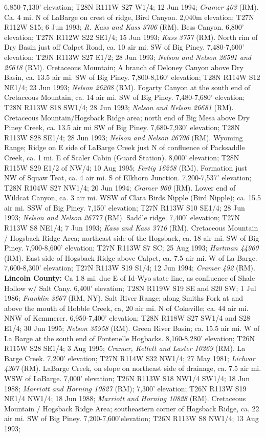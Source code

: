 6,850-7,130’ elevation; T28N R111W S27 W1/4; 12 Jun 1994; \textit{Cramer 403} (RM).  Ca. 4 mi. N of LaBarge on crest of ridge, Bird Canyon. 2,040m elevation; T27N R112W S15; 6 Jun 1993; \textit{R. Kass and Kass 3706} (RM).  Bess Canyon. 6,800’ elevation; T27N R112W S22 SE1/4; 15 Jun 1993; \textit{Kass 3757} (RM).  North rim of Dry Basin just off Calpet Road, ca. 10 air mi. SW of Big Piney. 7,480-7,600’ elevation; T29N R113W S27 E1/2; 28 Jun 1993; \textit{Nelson and Nelson 26591 and 26618} (RM).  Cretaceous Mountain; A branch of Deloney Canyon above Dry Basin, ca. 13.5 air mi. SW of Big Piney. 7,800-8,160’ elevation; T28N R114W S12 NE1/4; 23 Jun 1993; \textit{Nelson 26208} (RM). Fogarty Canyon at the south end of Cretaceous Mountain, ca. 14 air mi. SW of Big Piney. 7,480-7,680’ elevation; T28N R113W S18 SW1/4; 28 Jun 1993; \textit{Nelson and Nelson 26681} (RM).  Cretaceous Mountain/Hogsback Ridge area; north end of Big Mesa above Dry Piney Creek, ca. 13.5 air mi SW of Big Piney.	7,680-7,930' elevation; T28N R113W S28	SE1/4; 28 Jun 1993; \textit{Nelson and Nelson 26706} (RM).  Wyoming Range; Ridge on E side of LaBarge Creek just N of confluence of Packsaddle Creek, ca. 1 mi. E of Scaler Cabin (Guard Station). 8,000’ elevation; T28N R115W S29 E1/2 of NW/4; 10 Aug 1995; \textit{Fertig 16258} (RM).  Formation just NW of Squaw Teat, ca. 4 air mi. S of Elkhorn Junction. 7,200-7,537' elevation; T28N R104W S27 NW1/4; 20 Jun 1994; \textit{Cramer 960} (RM).  Lower end of Wildcat Canyon, ca. 3 air mi. WSW of Clara Birds Nipple (Bird Nipple); ca. 15.5 air mi. SSW of Big Piney. 7,150’ elevation; T27N R113W S10 SE1/4; 28 Jun 1993; \textit{Nelson and Nelson 26777} (RM).  Saddle ridge. 7,400’ elevation; T27N R113W S8 NE1/4; 7 Jun 1993; \textit{Kass and Kass 3716} (RM).  Cretaceous Mountain / Hogsback Ridge Area; northeast side of the Hogsback, ca. 18 air mi. SW of Big Piney. 7,900-8,600’ elevation; T27N R113W S7 SC; 25 Aug 1993; \textit{Hartman 44960} (RM).  East side of Hogsback Ridge above Calpet, ca. 7.5 air mi. W of La Barge. 7,600-8,300’ elevation; T27N R113W S19 S1/4; 12 Jun 1994; \textit{Cramer 492} (RM).  \textbf{Lincoln County:} Ca 1.8 mi. due E of Id-Wyo state line, as confluence of Shale Hollow w/ Salt Cany. 6,400' elevation; T28N R119W S19 SE and S20 SW; 1 Jul 1986; \textit{Franklin 3667} (RM, NY).  Salt River Range; along Smiths Fork at and above the mouth of Hobble Creek, ca, 20 air mi. N of Cokeville; ca. 44 air mi. NNW of Kemmerer. 6,950-7,400' elevation; T28N R118W S27	SW1/4 and S28 E1/4; 30 Jun 1995; \textit{Nelson 35958} (RM).  Green River Basin; ca. 15.5 air mi. W of La Barge at the south end of Fontenelle Hogbacks. 8,160-8,280' elevation; T26N R115W S28	SE1/4; 3 Aug 1995; \textit{Cramer, Kellett and Laster 10269} (RM).  La Barge Creek. 7,200' elevation; T27N R114W S32	NW1/4; 27 May 1981; \textit{Lichvar 4207} (RM).  LaBarge Creek, on slope on northeast side of drainage, ca. 7.5 air mi. WSW of LaBarge. 7,000’ elevation; T26N R113W S18 NW1/4 SW1/4; 18 Jun 1988; \textit{Marriott and Horning 10827} (RM); 7,300’ elevation; T26N R113W S19 NE1/4 NW1/4; 18 Jun 1988; \textit{Marriott and Horning 10828} (RM).  Cretaceous Mountain / Hogsback Ridge Area; southeastern corner of Hogsback Ridge, ca. 22 air mi. SW of Big Piney. 7,200-7,600'elevation; T26N R113W S8	NW1/4; 13 Aug 1993; 
